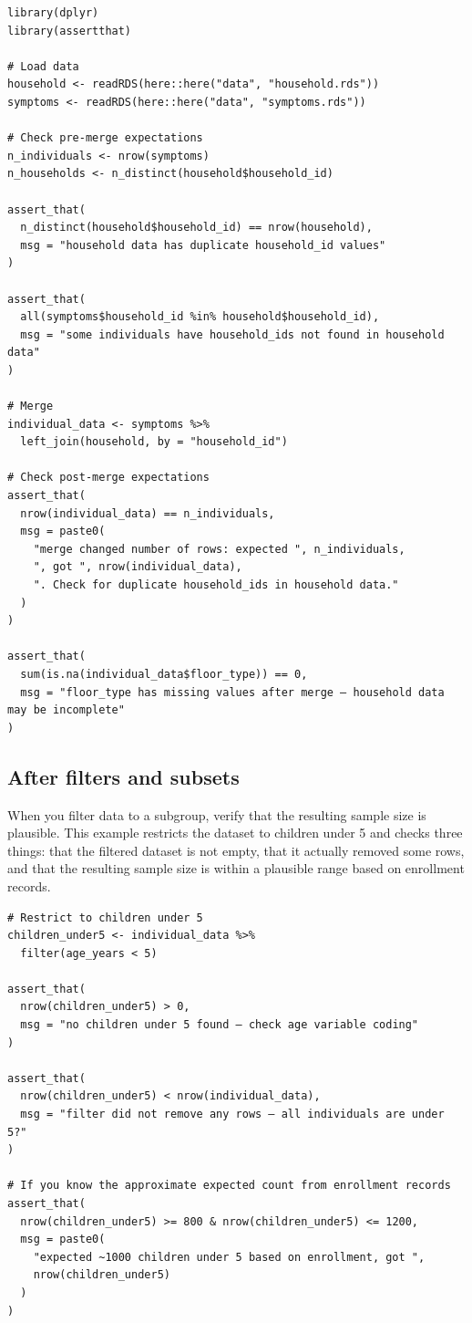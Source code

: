 \documentclass[
]{book}
\begin{document}
\begin{verbatim}
library(dplyr)
library(assertthat)

# Load data
household <- readRDS(here::here("data", "household.rds"))
symptoms <- readRDS(here::here("data", "symptoms.rds"))

# Check pre-merge expectations
n_individuals <- nrow(symptoms)
n_households <- n_distinct(household$household_id)

assert_that(
  n_distinct(household$household_id) == nrow(household),
  msg = "household data has duplicate household_id values"
)

assert_that(
  all(symptoms$household_id %in% household$household_id),
  msg = "some individuals have household_ids not found in household data"
)

# Merge
individual_data <- symptoms %>%
  left_join(household, by = "household_id")

# Check post-merge expectations
assert_that(
  nrow(individual_data) == n_individuals,
  msg = paste0(
    "merge changed number of rows: expected ", n_individuals,
    ", got ", nrow(individual_data),
    ". Check for duplicate household_ids in household data."
  )
)

assert_that(
  sum(is.na(individual_data$floor_type)) == 0,
  msg = "floor_type has missing values after merge — household data may be incomplete"
)
\end{verbatim}

\subsection{After filters and subsets}\label{after-filters-and-subsets}

When you filter data to a subgroup, verify that the resulting sample size is plausible. This example restricts the dataset to children under 5 and checks three things: that the filtered dataset is not empty, that it actually removed some rows, and that the resulting sample size is within a plausible range based on enrollment records.

\begin{verbatim}
# Restrict to children under 5
children_under5 <- individual_data %>%
  filter(age_years < 5)

assert_that(
  nrow(children_under5) > 0,
  msg = "no children under 5 found — check age variable coding"
)

assert_that(
  nrow(children_under5) < nrow(individual_data),
  msg = "filter did not remove any rows — all individuals are under 5?"
)

# If you know the approximate expected count from enrollment records
assert_that(
  nrow(children_under5) >= 800 & nrow(children_under5) <= 1200,
  msg = paste0(
    "expected ~1000 children under 5 based on enrollment, got ",
    nrow(children_under5)
  )
)
\end{verbatim}
\end{document}
